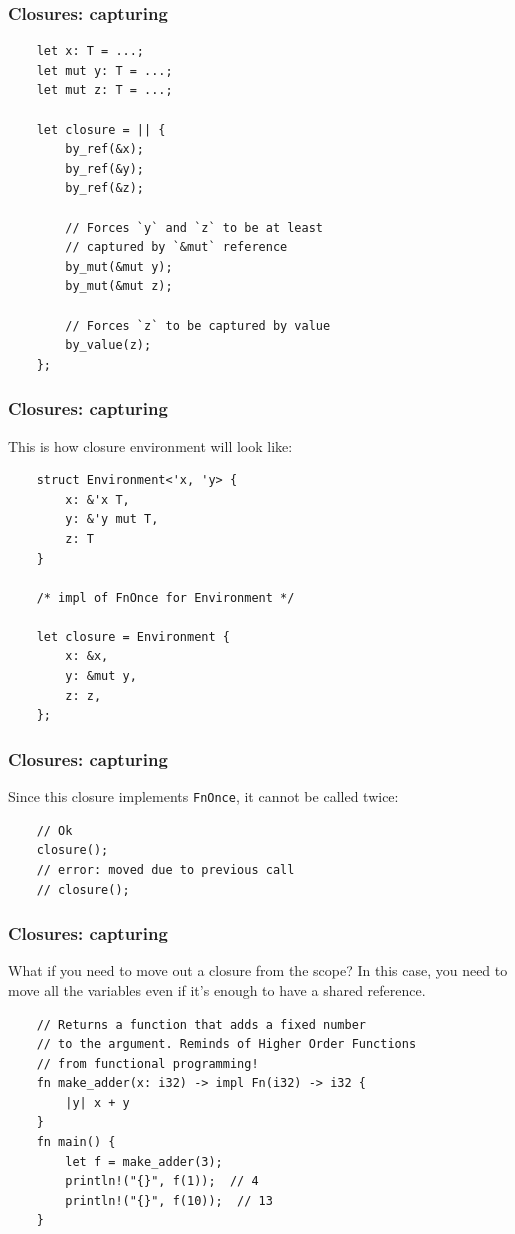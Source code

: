 \documentclass[aspectratio=1610,t]{beamer}
\begin{document}

\begin{frame}[fragile,c]
\frametitle{Closures: capturing}
\begin{verbatim}
    let x: T = ...;
    let mut y: T = ...;
    let mut z: T = ...;

    let closure = || {
        by_ref(&x);
        by_ref(&y);
        by_ref(&z);

        // Forces `y` and `z` to be at least
        // captured by `&mut` reference
        by_mut(&mut y);
        by_mut(&mut z);

        // Forces `z` to be captured by value
        by_value(z);
    };
\end{verbatim}
\end{frame}


\begin{frame}[fragile]
\frametitle{Closures: capturing}
This is how closure environment will look like:

\begin{verbatim}
    struct Environment<'x, 'y> {
        x: &'x T,
        y: &'y mut T,
        z: T
    }

    /* impl of FnOnce for Environment */

    let closure = Environment {
        x: &x,
        y: &mut y,
        z: z,
    };
\end{verbatim}
\end{frame}


\begin{frame}[fragile]
\frametitle{Closures: capturing}
Since this closure implements \texttt{FnOnce}, it cannot be called twice:

\begin{verbatim}
    // Ok
    closure();
    // error: moved due to previous call
    // closure();
\end{verbatim}
\end{frame}


\begin{frame}[fragile,c]
\frametitle{Closures: capturing}
What if you need to move out a closure from the scope? In this case, you need to move all the variables even if it's enough to have a shared reference.

\begin{verbatim}
    // Returns a function that adds a fixed number
    // to the argument. Reminds of Higher Order Functions
    // from functional programming!
    fn make_adder(x: i32) -> impl Fn(i32) -> i32 {
        |y| x + y
    }
    fn main() {
        let f = make_adder(3);
        println!("{}", f(1));  // 4
        println!("{}", f(10));  // 13
    }
\end{verbatim}
\end{frame}
\end{document}

